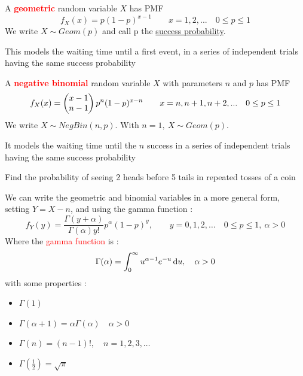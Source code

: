 \documentclass[12pt,a4paper]{article}
\begin{document}
\begin{boite}
     A \textbf{\textcolor{red}{geometric}} random variable $X$ has PMF 
    \begin{equation}
        f_X(x) =p(1-p)^{x-1} \qquad x=1,2,... \quad 0 \leq p \leq 1
        \label{equ:distribution_geometric}
    \end{equation}
    We write $X \sim Geom(p)$ and call p the \uline{success probability}. 
    \begin{blackbox}
        This models the waiting time until a first event, in a series of independent    trials having the same success probability
    \end{blackbox}
\end{boite}

\begin{boite}
     A \textbf{\textcolor{red}{negative binomial}} random variable $X$ with parameters $n$ and $p$ has PMF
    \begin{equation}
        f_X(x) = \begin{pmatrix} x-1 \\ n-1 \end{pmatrix}p^n(1-p)^{x-n} \qquad x = n, n+1, n+2,... \quad 0 \leq p \leq 1
        \label{equ:distribution_negative_binomial}
    \end{equation}
    We write $X \sim NegBin(n,p)$. With $n=1,\ X \sim Geom(p)$.
    \begin{blackbox}
        It models the waiting time until the $n$ success in a series of independent trials having the same success probability
    \end{blackbox}
\end{boite}
\begin{exemple}
    Find the probability of seeing 2 heads before 5 tails in repeated tosses of a coin
\end{exemple}

We can write the geometric and binomial variables in a more general form, setting $Y = X-n$, and using the gamma function :
\[f_Y(y) = \frac{\Gamma(y+\alpha)}{\Gamma(\alpha)y!}p^{\alpha}(1-p)^y,\qquad y =0,1,2,\ldots \quad 0 \leq p \leq 1,\ \alpha > 0\]
Where the \textcolor{red}{gamma function} is :
\begin{equation}
    \Gamma(\alpha) = \int_0^\infty u^{\alpha-1}e^{-u} \, \mathrm d u,\quad \alpha > 0
    \label{equ:gamma_function}
\end{equation}
with some properties :
\begin{multicols}{2}
    \begin{itemize}
        \item $\Gamma(1)$
        \item $\Gamma(\alpha+1) = \alpha\Gamma(\alpha) \quad \alpha > 0$
        \item $\Gamma(n) = (n-1)!,\quad n=1,2,3,\ldots$
        \item $\Gamma(\frac{1}{2}) = \sqrt{\pi}$
    \end{itemize}
\end{multicols}
\end{document}
